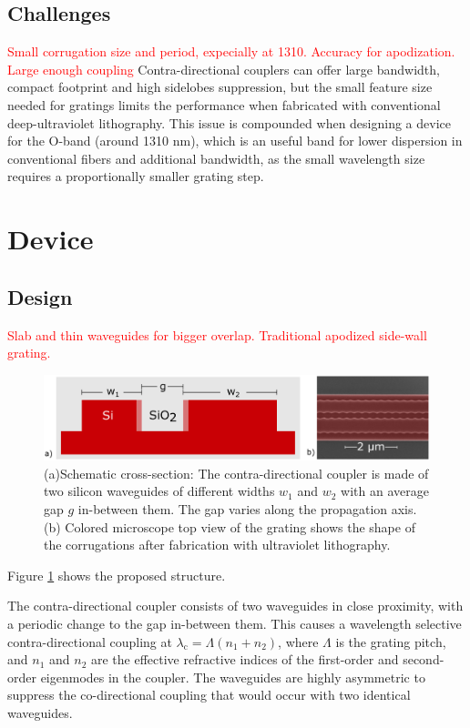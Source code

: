 \documentclass[letterpaper,10pt]{article}
\newcommand\todo[1]{\textcolor{red}{#1}}
\begin{document}
\subsection{Challenges}
\todo{Small corrugation size and period, expecially at 1310. Accuracy for apodization. Large enough coupling}
Contra-directional couplers can offer large bandwidth, compact footprint and high sidelobes suppression, but the small feature size needed for gratings limits the performance when fabricated with conventional deep-ultraviolet lithography\cite{shi2013ultra}\cite{shi2013coupler}. This issue is compounded when designing a device for the O-band (around 1310 nm), which is an useful band for lower dispersion in conventional fibers and additional bandwidth, as the small wavelength size requires a proportionally smaller grating step.



\section{Device}
\subsection{Design} 
\todo{Slab and thin waveguides for bigger overlap. Traditional apodized side-wall grating.}
\begin{figure}[htbp]
	\centering
	\includegraphics[width=.99\columnwidth]{CrossAndTop}
	\caption{ (a)Schematic cross-section: The contra-directional coupler is made of two silicon waveguides of different widths $w_1$ and $w_2$ with an average gap $g$ in-between them. The gap varies along the propagation axis. (b) Colored microscope top view of the grating shows the shape of the corrugations after fabrication with ultraviolet lithography. }
	\label{fig:Device}
\end{figure}
Figure \ref{fig:Device} shows the proposed structure.

The contra-directional coupler consists of two waveguides in close proximity, with a periodic change to the gap in-between them. This causes a wavelength selective contra-directional coupling at  $\lambda_\text{c} = \Lambda (n_\text{1}+n_\text{2})$, where $\Lambda$ is the grating pitch, and $n_\text{1}$ and $n_\text{2}$ are the effective refractive indices of the first-order and second-order eigenmodes in the coupler. 
The waveguides are highly asymmetric to suppress the co-directional coupling that would occur with two identical waveguides.
\end{document}

